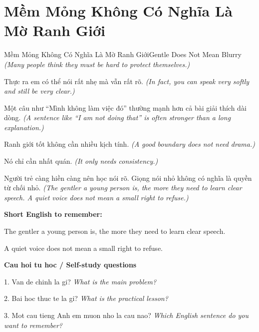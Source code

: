 \section{Mềm Mỏng Không Có Nghĩa Là Mờ Ranh Giới}
\begin{truyen}{Mềm Mỏng Không Có Nghĩa Là Mờ Ranh Giới}{Gentle Does Not Mean Blurry}
\textit{(Many people think they must be hard to protect themselves.)}

Thực ra em có thể nói rất nhẹ mà vẫn rất rõ.
\textit{(In fact, you can speak very softly and still be very clear.)}

Một câu như ``Mình không làm việc đó'' thường mạnh hơn cả bài giải thích dài dòng.
\textit{(A sentence like ``I am not doing that'' is often stronger than a long explanation.)}

Ranh giới tốt không cần nhiều kịch tính.
\textit{(A good boundary does not need drama.)}

Nó chỉ cần nhất quán.
\textit{(It only needs consistency.)}

\end{truyen}

\begin{baihoc}
Người trẻ càng hiền càng nên học nói rõ. Giọng nói nhỏ không có nghĩa là quyền từ chối nhỏ.
\textit{(The gentler a young person is, the more they need to learn clear speech. A quiet voice does not mean a small right to refuse.)}
\end{baihoc}

\begin{ghinhoanh}
\textbf{Short English to remember:}

The gentler a young person is, the more they need to learn clear speech.

A quiet voice does not mean a small right to refuse.

\end{ghinhoanh}

\begin{tuhocnhanh}
\textbf{Cau hoi tu hoc / Self-study questions}

1. Van de chinh la gi? \textit{What is the main problem?}

2. Bai hoc thuc te la gi? \textit{What is the practical lesson?}

3. Mot cau tieng Anh em muon nho la cau nao? \textit{Which English sentence do you want to remember?}
\end{tuhocnhanh}
\ngancach

